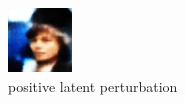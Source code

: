 \documentclass[11pt]{article}
\numberwithin{equation}{section}
\begin{document}
\begin{figure}[h]
\begin{minipage}{0.4\textwidth}
        \includegraphics[width=\textwidth]{ex02/beta20.0-rotated_right.png}
        \caption{positive latent perturbation}
    \end{minipage}
\end{figure}
\end{document}

